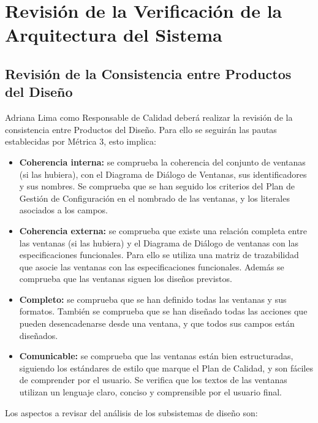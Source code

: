 \section{Revisión de la Verificación de la Arquitectura del Sistema}
\subsection{Revisión de la Consistencia entre Productos del Diseño}
\par Adriana Lima como Responsable de Calidad deberá realizar la revisión de la consistencia entre Productos del Diseño. Para ello se seguirán las pautas establecidas por Métrica 3, esto implica:
\begin{itemize}[-]
  \item \textbf{Coherencia interna:} se comprueba la coherencia del conjunto de ventanas (si las hubiera), con el Diagrama de Diálogo de Ventanas, sus identificadores y sus nombres. Se comprueba que se han seguido los criterios del Plan de Gestión de Configuración en el nombrado de las ventanas, y los literales asociados a los campos.
  \item \textbf{Coherencia externa:} se comprueba que existe una relación completa entre las ventanas (si las hubiera) y el Diagrama de Diálogo de ventanas con las especificaciones funcionales. Para ello se utiliza una matriz de trazabilidad que asocie las ventanas con las especificaciones funcionales. Además se comprueba que las ventanas siguen los diseños previstos.
  \item \textbf{Completo:} se comprueba que se han definido todas las ventanas y sus formatos. También se comprueba que se han diseñado todas las acciones que pueden desencadenarse desde una ventana, y que todos sus campos están diseñados.
  \item \textbf{Comunicable:} se comprueba que las ventanas están bien estructuradas, siguiendo los estándares de estilo que marque el Plan de Calidad, y son fáciles de comprender por el usuario. Se verifica que los textos de las ventanas utilizan un lenguaje claro, conciso y comprensible por el usuario final.
\end{itemize}

\par Los aspectos a revisar del análisis de los subsistemas de diseño son:

